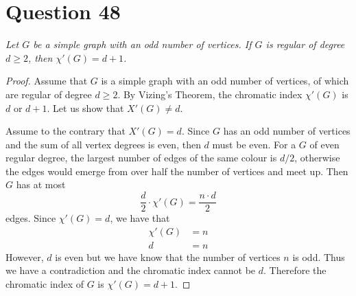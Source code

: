 \documentclass[11pt, oneside]{article}   	%
\begin{document}
\section*{Question 48}

\emph{Let $G$ be a simple graph with an odd number of vertices. If $G$ is regular of degree $d\geq 2$, then $\chi'(G)=d+1$.}

\begin{proof}
Assume that $G$ is a simple graph with an odd number of vertices, of which are regular of degree $d\geq 2$. By Vizing's Theorem, the chromatic index $\chi'(G)$ is $d$ or $d+1$. Let us show that $X'(G) \neq d$.

Assume to the contrary that $X'(G) = d$. Since $G$ has an odd number of vertices and the sum of all vertex degrees is even, then $d$ must be even. For a $G$ of even regular degree, the largest number of edges of the same colour is $d/2$, otherwise the edges would emerge from over half the number of vertices and meet up. Then $G$ has at most
$$\frac{d}{2} \cdot \chi'(G) = \frac{n \cdot d}{2}$$
edges. Since $\chi'(G)=d$, we have that
\begin{align*}
	\chi'(G) & = n \\
	d & = n
\end{align*}
However, $d$ is even but we have know that the number of vertices $n$ is odd. Thus we have a contradiction and the chromatic index cannot be $d$. Therefore the chromatic index of $G$ is $\chi'(G)=d+1$.
\end{proof}
\end{document}
